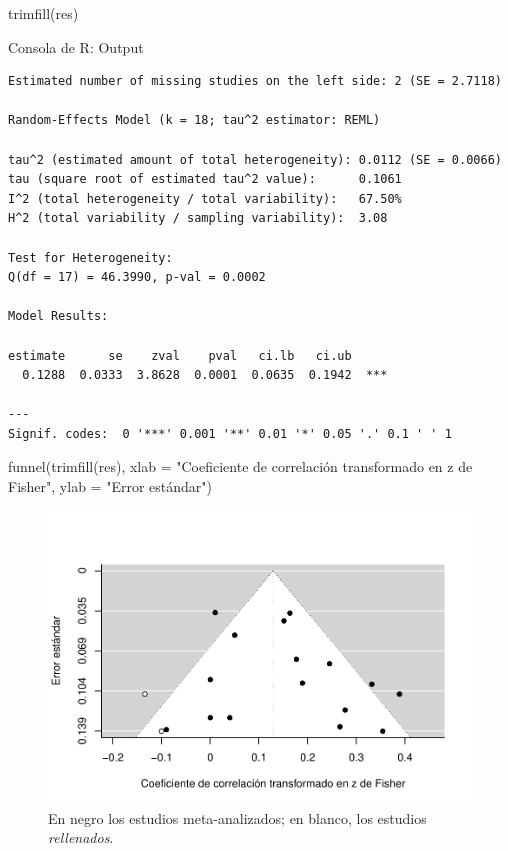 \documentclass[
  bookmarksnumbered]{article}
\newenvironment{Shaded}{\begin{snugshade}}{\end{snugshade}}
\newcommand{\AttributeTok}[1]{\textcolor[rgb]{0.00,0.34,0.68}{#1}}
\newcommand{\FunctionTok}[1]{\textcolor[rgb]{0.39,0.29,0.61}{#1}}
\newcommand{\NormalTok}[1]{\textcolor[rgb]{0.12,0.11,0.11}{#1}}
\newcommand{\StringTok}[1]{\textcolor[rgb]{0.75,0.01,0.01}{#1}}
\begin{document}
\begin{Shaded}
\begin{Highlighting}[]
\FunctionTok{trimfill}\NormalTok{(res)}
\end{Highlighting}
\end{Shaded}

\begin{ROut}{Consola de R: Output~\thetcbcounter}
                \begin{footnotesize}
                \begin{verbatim} 
Estimated number of missing studies on the left side: 2 (SE = 2.7118)

Random-Effects Model (k = 18; tau^2 estimator: REML)

tau^2 (estimated amount of total heterogeneity): 0.0112 (SE = 0.0066)
tau (square root of estimated tau^2 value):      0.1061
I^2 (total heterogeneity / total variability):   67.50%
H^2 (total variability / sampling variability):  3.08

Test for Heterogeneity:
Q(df = 17) = 46.3990, p-val = 0.0002

Model Results:

estimate      se    zval    pval   ci.lb   ci.ub 
  0.1288  0.0333  3.8628  0.0001  0.0635  0.1942  *** 

---
Signif. codes:  0 '***' 0.001 '**' 0.01 '*' 0.05 '.' 0.1 ' ' 1
 \end{verbatim}
                \end{footnotesize}
                \end{ROut}

\begin{Shaded}
\begin{Highlighting}[]
\FunctionTok{funnel}\NormalTok{(}\FunctionTok{trimfill}\NormalTok{(res), }
       \AttributeTok{xlab =} \StringTok{"Coeficiente de correlación transformado en z de Fisher"}\NormalTok{,}
       \AttributeTok{ylab =} \StringTok{"Error estándar"}\NormalTok{)}
\end{Highlighting}
\end{Shaded}

\begin{figure}
\centering
\includegraphics{Meta-analysis_files/figure-latex/unnamed-chunk-20-1.pdf}
\caption{\label{fig:unnamed-chunk-20}En negro los estudios meta-analizados; en blanco, los estudios \emph{rellenados}.}
\end{figure}
\end{document}

